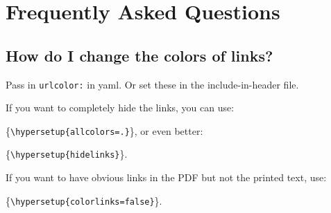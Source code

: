 \documentclass[
  letterpaper,
  12pt,
  oneside,
  spanish,
  doublespacing,
  headsepline,
  parskip]{MastersDoctoralThesis}
\begin{document}
\appendix
{}

\hypertarget{sec-appA}{%
\chapter{Frequently Asked Questions}\label{sec-appA}}

\hypertarget{how-do-i-change-the-colors-of-links}{%
\section{How do I change the colors of
links?}\label{how-do-i-change-the-colors-of-links}}

Pass in \texttt{urlcolor:} in yaml. Or set these in the
include-in-header file.

\noindent If you want to completely hide the links, you can use:

\{\small\verb!\hypersetup{allcolors=.}!\}, or even better:

\{\small\verb!\hypersetup{hidelinks}!\}.

\noindent If you want to have obvious links in the PDF but not the
printed text, use:

\{\small\verb!\hypersetup{colorlinks=false}!\}.
\end{document}
